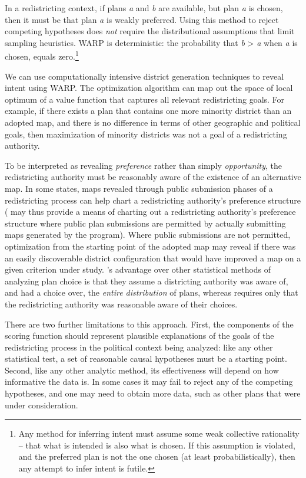 \documentclass[article]{JSSstyle/jss}
\begin{document}
In a redistricting context, if plans \textit{a} and \textit{b} are available, but 
plan \textit{a} is
chosen, then it must be that plan \textit{a} is weakly preferred.  Using this 
method to reject competing hypotheses does \textit{not}
require the distributional assumptions that limit sampling heuristics.  WARP is 
deterministic: the probability that \textit{b }{\textgreater}
\textit{a} when \textit{a} is chosen, equals zero.\footnote{Any
method for inferring intent must assume some weak collective
rationality -- that what is intended is also what is chosen. If this
assumption is violated, and the preferred plan is not the one chosen
(at least probabilistically), then any attempt to infer intent is
futile.}

We can use computationally intensive district generation techniques 
to reveal intent using WARP.  The optimization algorithm can  
map out the space of local optimum of a value function that captures all relevant 
redistricting goals.  For example, if there exists a plan that contains one more 
minority district than an adopted map, and there is no difference in terms of other
geographic and political goals, then maximization of minority districts was not a 
goal of a redistricting authority.

To be interpreted as revealing \textit{preference} 
rather than simply \textit{opportunity}, the redistricting authority must be reasonably aware
of the existence of an alternative map.  In some states, maps revealed through 
public submission phases of a redistricting process can help chart a redistricting authority's preference
structure ( may thus provide a means of charting out a redistricting authority's preference structure
where public plan submissions are permitted by actually submitting maps generated by the program).  
Where public submissions are not permitted, optimization from the starting point of the adopted map may reveal if there was an easily discoverable district configuration that would have improved
a map on a given criterion under study. 's advantage over other
statistical methods of analyzing plan choice is that they assume a districting authority was aware of, and had a choice over, the
\textit{entire distribution} of plans, whereas  requires only that the redistricting authority was reasonable aware of their choices.

There are two further limitations to this approach.  First, the components of the scoring function 
should represent plausible explanations of the goals of
the redistricting process in the political context being analyzed: like
any other statistical test, a set of reasonable causal hypotheses must
be a starting point. Second, like any other analytic method, its
effectiveness will depend on how informative the data is. In some cases
it may fail to reject any of the competing hypotheses, and one may need
to obtain more data, such as other plans that were under consideration.
\end{document}
